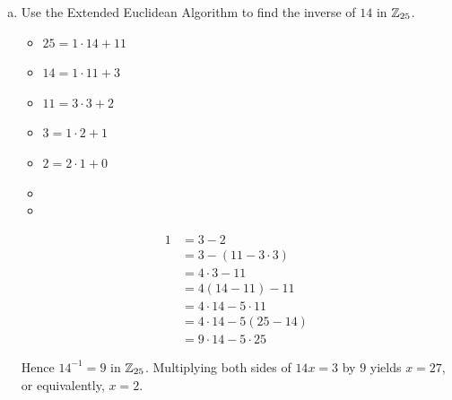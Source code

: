 \documentclass[11pt,fleqn,dvipsnames,usenames]{article}
\begin{document}
\begin{enumerate}
\solution
\begin{enumerate}[(a)]
\item Use the Extended Euclidean Algorithm to find the inverse of $14$ in $\mathbb{Z}_{25}$.
\begin{multicols}{2}
\begin{itemize}[\ ]
\item $25 = 1\cdot 14 + 11$
\item $14 = 1\cdot 11 + 3$
\item $11 = 3\cdot 3 + 2$
\item $3 = 1\cdot 2 + 1$
\item $2 = 2\cdot 1 + 0$
\item
\item
\end{itemize}
\columnbreak
\begin{align*}
1 &= 3 - 2\\
&= 3 - (11 - 3\cdot 3)\\
&= 4\cdot 3 - 11\\
&= 4(14 - 11) - 11\\
&= 4\cdot 14 - 5\cdot 11\\
&= 4\cdot 14 - 5(25 - 14)\\
&= 9\cdot 14 - 5\cdot 25
\end{align*}
\end{multicols}
Hence $14^{-1} = 9$ in $\mathbb{Z}_{25}$.  Multiplying both sides of $14x=3$ by $9$ yields $x=27$, or equivalently, $x=2$.
\end{enumerate}
\end{enumerate}
\end{document}
